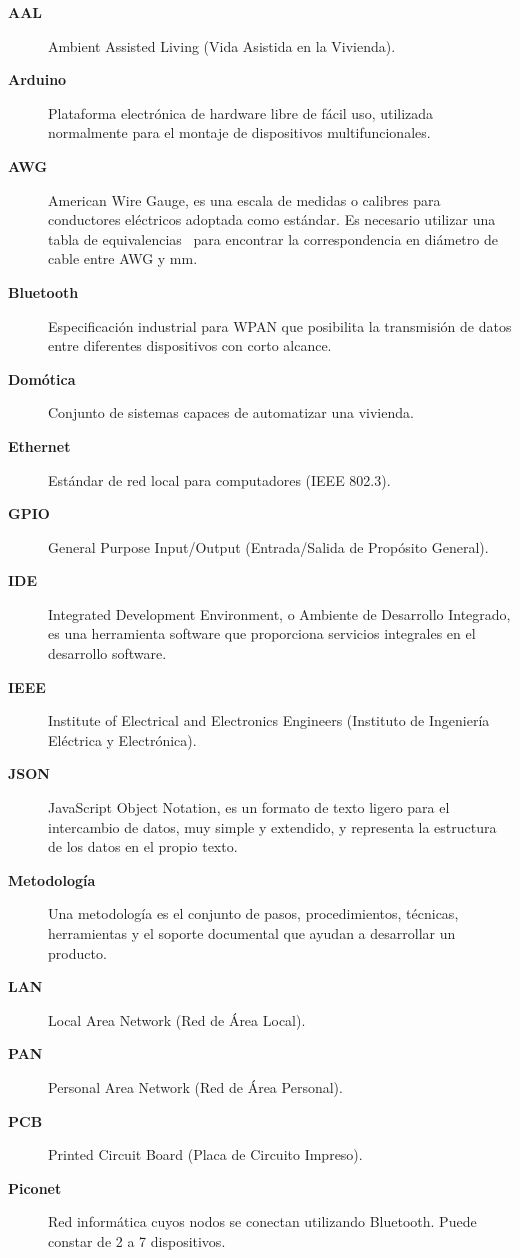 \begin{description}
    \item[\textbf{AAL}] Ambient Assisted Living (Vida Asistida en la Vivienda).
    \item[\textbf{Arduino}] Plataforma electrónica de hardware libre de fácil uso, utilizada normalmente para el montaje de dispositivos multifuncionales.
    \item[\textbf{AWG}] American Wire Gauge, es una escala de medidas o calibres para conductores eléctricos adoptada como estándar. Es necesario utilizar una tabla de equivalencias~\cite{awg_table} para encontrar la correspondencia en diámetro de cable entre AWG y mm.
    \item[\textbf{Bluetooth}] Especificación industrial para WPAN que posibilita la transmisión de datos entre diferentes dispositivos con corto alcance. 
    \item[\textbf{Domótica}] Conjunto de sistemas capaces de automatizar una vivienda.
    \item[\textbf{Ethernet}] Estándar de red local para computadores (IEEE 802.3).
    \item[\textbf{GPIO}] General Purpose Input/Output (Entrada/Salida de Propósito General).
    \item[\textbf{IDE}] Integrated Development Environment, o Ambiente de Desarrollo Integrado, es una herramienta software que proporciona servicios integrales en el desarrollo software.
    \item[\textbf{IEEE}] Institute of Electrical and Electronics Engineers (Instituto de Ingeniería Eléctrica y Electrónica).
    \item[\textbf{JSON}] JavaScript Object Notation, es un formato de texto ligero para el intercambio de datos, muy simple y extendido, y representa la estructura de los datos en el propio texto.
    \item[\textbf{Metodología}] Una metodología es el conjunto de pasos, procedimientos, técnicas, herramientas y el soporte documental que ayudan a desarrollar un producto.
    \item[\textbf{LAN}] Local Area Network (Red de Área Local).
    \item[\textbf{PAN}] Personal Area Network (Red de Área Personal).
    \item[\textbf{PCB}] Printed Circuit Board (Placa de Circuito Impreso).
    \item[\textbf{Piconet}] Red informática cuyos nodos se conectan utilizando Bluetooth. Puede constar de 2 a 7 dispositivos.

\end{description}
